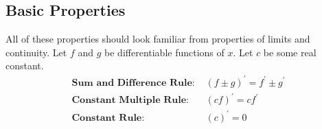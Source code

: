 \subsection{Basic Properties}
All of these properties should look familiar from properties of limits and continuity.
Let $f$ and $g$ be differentiable functions of $x$.
Let $c$ be some real constant.
\begin{align*}
	\textbf{Sum and Difference Rule: }& (f \pm g)^\prime = f^\prime \pm g^\prime \\
	\textbf{Constant Multiple Rule: }& (cf)^\prime = cf^\prime \\
	\textbf{Constant Rule: }& (c)^\prime = 0
\end{align*}
